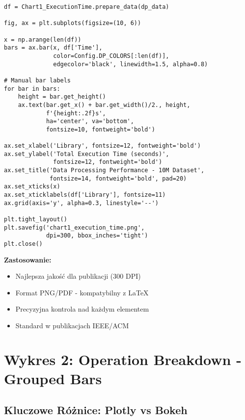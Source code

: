 \documentclass[a4paper,11pt]{article}
\begin{document}
\begin{lstlisting}[caption={Chart 1: Execution Time - Matplotlib (PNG 300 DPI)},label={lst:chart1_matplotlib}]
df = Chart1_ExecutionTime.prepare_data(dp_data)

fig, ax = plt.subplots(figsize=(10, 6))

x = np.arange(len(df))
bars = ax.bar(x, df['Time'], 
              color=Config.DP_COLORS[:len(df)],
              edgecolor='black', linewidth=1.5, alpha=0.8)

# Manual bar labels
for bar in bars:
    height = bar.get_height()
    ax.text(bar.get_x() + bar.get_width()/2., height,
            f'{height:.2f}s',
            ha='center', va='bottom', 
            fontsize=10, fontweight='bold')

ax.set_xlabel('Library', fontsize=12, fontweight='bold')
ax.set_ylabel('Total Execution Time (seconds)', 
              fontsize=12, fontweight='bold')
ax.set_title('Data Processing Performance - 10M Dataset',
             fontsize=14, fontweight='bold', pad=20)
ax.set_xticks(x)
ax.set_xticklabels(df['Library'], fontsize=11)
ax.grid(axis='y', alpha=0.3, linestyle='--')

plt.tight_layout()
plt.savefig('chart1_execution_time.png', 
            dpi=300, bbox_inches='tight')
plt.close()
\end{lstlisting}

\textbf{Zastosowanie:}
\begin{itemize}
    \item Najlepsza jakość dla publikacji (300 DPI)
    \item Format PNG/PDF - kompatybilny z LaTeX
    \item Precyzyjna kontrola nad każdym elementem
    \item Standard w publikacjach IEEE/ACM
\end{itemize}

\section{Wykres 2: Operation Breakdown - Grouped Bars}

\subsection{Kluczowe Różnice: Plotly vs Bokeh}
\end{document}
